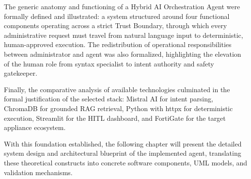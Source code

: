 The generic anatomy and functioning of a Hybrid AI Orchestration Agent were formally defined and illustrated: a system structured around four functional components operating across a strict Trust Boundary, through which every administrative request must travel from natural language input to deterministic, human-approved execution. The redistribution of operational responsibilities between administrator and agent was also formalized, highlighting the elevation of the human role from syntax specialist to intent authority and safety gatekeeper.

Finally, the comparative analysis of available technologies culminated in the formal justification of the selected stack: Mistral AI for intent parsing, ChromaDB for grounded RAG retrieval, Python with httpx for deterministic execution, Streamlit for the HITL dashboard, and FortiGate for the target appliance ecosystem.

With this foundation established, the following chapter will present the detailed system design and architectural blueprint of the implemented agent, translating these theoretical constructs into concrete software components, UML models, and validation mechanisms.
